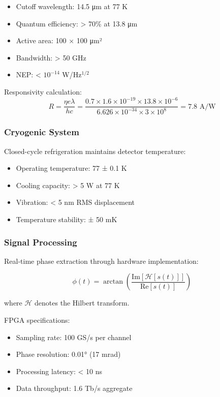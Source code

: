 \documentclass[12pt,twocolumn]{article}
\begin{document}
\begin{itemize}
\item Cutoff wavelength: 14.5 μm at 77 K
\item Quantum efficiency: > 70\% at 13.8 μm
\item Active area: 100 × 100 μm²
\item Bandwidth: > 50 GHz
\item NEP: < $10^{-14}$ W/Hz$^{1/2}$
\end{itemize}

Responsivity calculation:
\begin{equation}
R = \frac{\eta e \lambda}{hc} = \frac{0.7 \times 1.6 \times 10^{-19} \times 13.8 \times 10^{-6}}{6.626 \times 10^{-34} \times 3 \times 10^8} = 7.8 \text{ A/W}
\end{equation}

\subsubsection{Cryogenic System}

Closed-cycle refrigeration maintains detector temperature:
\begin{itemize}
\item Operating temperature: 77 ± 0.1 K
\item Cooling capacity: > 5 W at 77 K
\item Vibration: < 5 nm RMS displacement
\item Temperature stability: ± 50 mK
\end{itemize}

\subsubsection{Signal Processing}

Real-time phase extraction through hardware implementation:

\begin{equation}
\phi(t) = \arctan\left(\frac{\text{Im}[\mathcal{H}[s(t)]]}{\text{Re}[s(t)]}\right)
\end{equation}

where $\mathcal{H}$ denotes the Hilbert transform.

FPGA specifications:
\begin{itemize}
\item Sampling rate: 100 GS/s per channel
\item Phase resolution: 0.01° (17 mrad)
\item Processing latency: < 10 ns
\item Data throughput: 1.6 Tb/s aggregate
\end{itemize}
\end{document}
